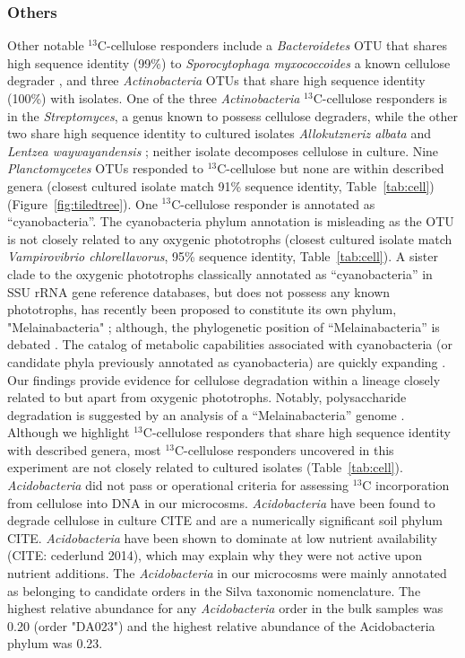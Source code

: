 \documentclass{article}
\begin{document}
\subsubsection{Others}\label{cell:others}
Other notable $^{13}$C-cellulose responders include a \textit{Bacteroidetes}
OTU that shares high sequence identity (99\%) to \textit{Sporocytophaga
myxococcoides} a known cellulose degrader \citep{Vance_1980}, and three
\textit{Actinobacteria} OTUs that share high sequence identity (100\%) with
isolates. One of the three \textit{Actinobacteria}
$^{13}$C-cellulose responders is in the \textit{Streptomyces}, a genus known to
possess cellulose degraders, while the other two share high sequence identity
to cultured isolates \textit{Allokutzneriz albata} \citep{Labeda_2008,
Tomita_1993} and \textit{Lentzea waywayandensis} \citep{LABEDA_1989,
Labeda_2001}; neither isolate decomposes cellulose in culture. Nine
\textit{Planctomycetes} OTUs responded to $^{13}$C-cellulose but none are within
described genera (closest cultured isolate match 91\% sequence identity,
Table~\ref{tab:cell}) (Figure~\ref{fig:tiledtree}). One
$^{13}$C-cellulose responder is annotated as ``cyanobacteria''.
The cyanobacteria phylum annotation is misleading as the OTU is not closely
related to any oxygenic phototrophs (closest cultured isolate match
\textit{Vampirovibrio chlorellavorus}, 95\% sequence identity,
Table~\ref{tab:cell}). A sister clade to the oxygenic phototrophs classically
annotated as ``cyanobacteria'' in SSU rRNA gene reference databases, but does
not possess any known phototrophs, has recently been proposed to constitute its own
phylum, "Melainabacteria" \citep{Di_Rienzi_2013}; although, the phylogenetic
position of ``Melainabacteria'' is debated \citep{Soo_2014}. The catalog of
metabolic capabilities associated with cyanobacteria (or candidate phyla
previously annotated as cyanobacteria) are quickly expanding
\citep{Di_Rienzi_2013, Soo_2014}. Our findings provide evidence for cellulose
degradation within a lineage closely related to but apart from oxygenic
phototrophs. Notably, polysaccharide degradation is suggested by an analysis of
a ``Melainabacteria'' genome \citep{Di_Rienzi_2013}. Although we highlight
$^{13}$C-cellulose responders that share high sequence identity with described
genera, most $^{13}$C-cellulose responders uncovered in this experiment are not
closely related to cultured isolates (Table~\ref{tab:cell}).
\textit{Acidobacteria} did not pass or operational criteria for assessing
$^{13}$C incorporation from cellulose into DNA in our microcosms. 
\textit{Acidobacteria} have been found to degrade cellulose in culture CITE and
are a numerically significant soil phylum CITE. \textit{Acidobacteria} have
been shown to dominate at low nutrient availability (CITE: cederlund 2014),
which may explain why they were not active upon nutrient additions. 
The \textit{Acidobacteria} in our microcosms were mainly annotated as belonging
to candidate orders in the Silva taxonomic nomenclature. The highest relative
abundance for any \textit{Acidobacteria} order in the bulk samples was 0.20
(order "DA023") and the highest relative abundance of the Acidobacteria phylum
was 0.23.
\end{document}
